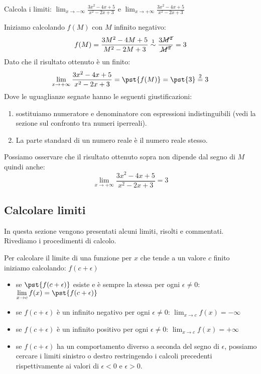 \begin{esempio}
Calcola i limiti: 
\(\displaystyle \lim_{x \to -\infty}\frac{3x^2-4x+5}{x^2-2x+3}\)
\quad e \quad
\(\displaystyle \lim_{x \to +\infty}\frac{3x^2-4x+5}{x^2-2x+3}\)

Iniziamo calcolando \(f(M)\) con \(M\) infinito negativo:
\[f(M) = \dfrac{3M^2-4M+5}{M^2-2M+3} \stackrel{1}{\sim} 
\dfrac{3\cancel{M^2}}{\cancel{M^2}} = 3\]
Dato che il risultato ottenuto è un finito:
\[\lim_{x \to +\infty}\frac{3x^2-4x+5}{x^2-2x+3} = 
  \pst{f(M)} = \pst{3} \stackrel{2}{=} 3\]
Dove le uguaglianze segnate hanno le seguenti giustificazioni:
\begin{enumerate} [nosep]
\item sostituiamo numeratore e denominatore con espressioni indistinguibili 
(vedi la sezione sul confronto tra numeri iperreali).
\item La parte standard di un numero reale è il numero reale stesso.
\end{enumerate}
Possiamo osservare che il risultato ottenuto sopra non dipende dal segno di 
\(M\) quindi anche: 
\[\displaystyle \lim_{x \to +\infty}\frac{3x^2-4x+5}{x^2-2x+3} = 3\]
\begin{center} \limiteallinfinito \end{center}
\end{esempio}

\subsection{Calcolare limiti}
\label{subsec:cont_limiti_calcolo}

In questa sezione vengono presentati alcuni limiti, risolti e commentati.
Rivediamo i procedimenti di calcolo.
\begin{procedura}
Per calcolare il limite di una funzione per \(x\) che tende a un 
valore \(c\) finito iniziamo calcolando:
\(f(c + \epsilon)\)
\begin{itemize}
\item 
se \(\pst{f(c + \epsilon)}\) esiste e è sempre la stessa 
per ogni \(\epsilon \neq 0\): \quad 
\(\displaystyle \lim_{x \to c}f(x) = \pst{f(c + \epsilon)}\)
\item 
se \(f(c + \epsilon)\) è un infinito negativo per ogni \(\epsilon \neq 0\): 
\quad \(\displaystyle \lim_{x \to c}f(x) = -\infty\)
\item 
se \(f(c + \epsilon)\) è un infinito positivo per ogni \(\epsilon \neq 0\): 
\quad \(\displaystyle \lim_{x \to c}f(x) = +\infty\)
\item 
se \(f(c + \epsilon)\) ha un comportamento diverso a seconda del 
segno di \(\epsilon\), possiamo cercare i limiti sinistro o destro
restringendo i calcoli precedenti rispettivamente ai valori di 
\(\epsilon < 0\) e \(\epsilon > 0\). 
\end{itemize}
\end{procedura}

